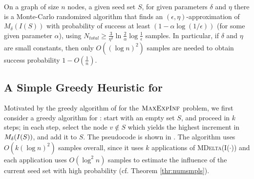 %
\begin{theorem} 
\label{thr:numsmpls}
  On a graph of size $n$ nodes,  a given seed set $S$, for  given parameters
   $\delta$ and $\eta$
  there is a Monte-Carlo randomized algorithm that finds an $(\epsilon, \eta)$-approximation of $M_{\delta}(I(S))$
  with probability of success  at least
$(1 - \alpha \log(1/\epsilon))$ (for some given parameter $\alpha$), using
$N_{\mathit{total}} \geq \frac{3}{\eta^2}\ln{\frac{2}{\alpha}} \log{\frac{1}{\epsilon}}$ samples.
  In particular, if  $\delta$ and $\eta$ are small constants, then only
  $O((\log n)^2)$ samples are needed to obtain success probability
  $1- O\left(\frac{1}{n}\right)$.
\end{theorem}
%
\subsection{A Simple Greedy Heuristic for \mdelta}
\label{sec:heu}

Motivated by the greedy algorithm of \cite{kkt-2003} for the $\textsc{MaxExpInf}{}$ problem, we first consider a greedy algorithm for \mdelta{}: start with an empty set $S$, and proceed in
$k$ steps; in each step, select the node $v\not\in S$ which yields the highest increment in $\mbox{$M_{\delta}(I(S))$}$, and add it to $S$. The pseudocode is shown in . The algorithm uses  $O(k(\log n)^2)$ samples overall, since it uses
$k$ applications of \textsc{MDelta(I($\cdot$))}  and each application uses $O(\log^2 n)$ samples to estimate the influence
of the current seed set with high probability (cf. Theorem  \ref{thr:numsmpls}).

